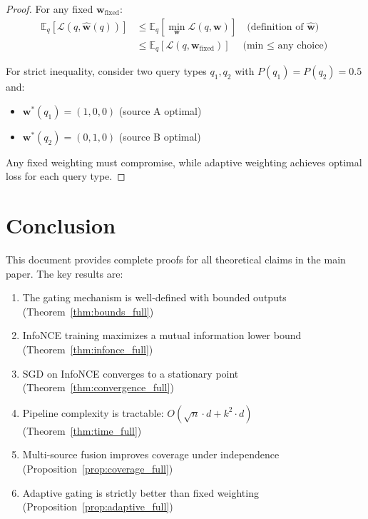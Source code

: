 \documentclass[11pt]{article}
\begin{document}
\begin{proof}
For any fixed $\mathbf{w}_{\text{fixed}}$:
\begin{align}
\mathbb{E}_q[\mathcal{L}(q, \hat{\mathbf{w}}(q))] &\leq \mathbb{E}_q[\min_\mathbf{w} \mathcal{L}(q, \mathbf{w})] \quad \text{(definition of } \hat{\mathbf{w}}\text{)} \\
&\leq \mathbb{E}_q[\mathcal{L}(q, \mathbf{w}_{\text{fixed}})] \quad \text{(min $\leq$ any choice)}
\end{align}

For strict inequality, consider two query types $q_1, q_2$ with $P(q_1) = P(q_2) = 0.5$ and:
\begin{itemize}
    \item $\mathbf{w}^*(q_1) = (1, 0, 0)$ (source A optimal)
    \item $\mathbf{w}^*(q_2) = (0, 1, 0)$ (source B optimal)
\end{itemize}

Any fixed weighting must compromise, while adaptive weighting achieves optimal loss for each query type.
\end{proof}

\section{Conclusion}

This document provides complete proofs for all theoretical claims in the main paper. The key results are:

\begin{enumerate}
    \item The gating mechanism is well-defined with bounded outputs (Theorem~\ref{thm:bounds_full})
    \item InfoNCE training maximizes a mutual information lower bound (Theorem~\ref{thm:infonce_full})
    \item SGD on InfoNCE converges to a stationary point (Theorem~\ref{thm:convergence_full})
    \item Pipeline complexity is tractable: $O(\sqrt{n} \cdot d + k^2 \cdot d)$ (Theorem~\ref{thm:time_full})
    \item Multi-source fusion improves coverage under independence (Proposition~\ref{prop:coverage_full})
    \item Adaptive gating is strictly better than fixed weighting (Proposition~\ref{prop:adaptive_full})
\end{enumerate}
\end{document}
